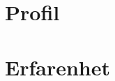 \documentclass{article}
\begin{document}
	\noindent
	\begin{minipage}[t]{0.7\textwidth}
		\vspace{-20pt} %
		\section*{\textcolor{colorBlue}{Profil}}
		
			\section*{\textcolor{colorBlue}{Erfarenhet}}
		
		\vspace{10pt} %
		
	\end{minipage}%
	\hfill
\end{document}
